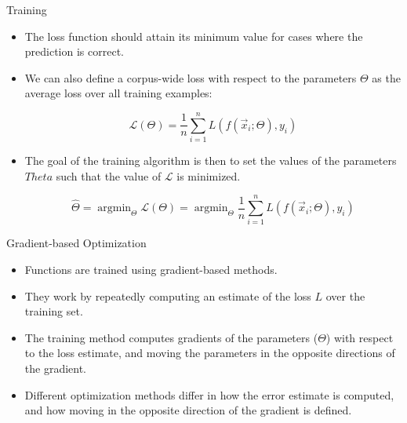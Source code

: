 \documentclass[handout]{beamer}
\begin{document}
\begin{frame}{Training}
\begin{scriptsize}
\begin{itemize}
\item The loss function should attain its minimum value for cases where the prediction is correct.

\item We can also define a corpus-wide loss with respect to the parameters $\Theta$ as the average loss over all training examples:

\begin{displaymath}
 \mathcal{L}(\Theta) = \frac{1}{n} \sum_{i=1}^n L(f(\vec{x}_i;\Theta), y_i)
\end{displaymath}

\item The goal of the training algorithm is then to set the values of the parameters $Theta$  such that the value of $\mathcal{L}$ is minimized.


\begin{displaymath}
 \hat{\Theta} = \operatorname{argmin}_{\Theta} \mathcal{L}(\Theta) =  \operatorname{argmin}_{\Theta} \frac{1}{n} \sum_{i=1}^n L(f(\vec{x}_i;\Theta), y_i)
\end{displaymath}


\end{itemize}


\end{scriptsize}
\end{frame}



\begin{frame}{Gradient-based Optimization}
\begin{scriptsize}
\begin{itemize}
\item Functions are trained using  gradient-based methods.

\item They work by repeatedly computing an estimate of the loss $L$ over the training set.



\item The training method computes gradients of the parameters ($\Theta$)  with respect to the loss estimate, and moving the parameters in the opposite directions of the gradient. 

\item Different optimization methods differ in how the error estimate is computed, and how moving in the opposite direction of the gradient is defined.

\end{itemize}


\end{scriptsize}
\end{frame}
\end{document}
